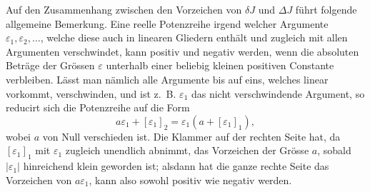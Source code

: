 \documentclass[11pt,a4paper,leqno]{article}
\begin{document}
Auf den Zusammenhang zwischen den Vorzeichen von $\delta J$ und $\Delta J$ führt folgende allgemeine Bemerkung. Eine reelle Potenzreihe irgend welcher Argumente $\varepsilon_1,\varepsilon_2,\ldots$, welche diese auch in linearen Gliedern enthält und zugleich mit allen Argumenten verschwindet, kann positiv und negativ werden, wenn die absoluten Beträge der Grössen $\varepsilon$ unterhalb einer beliebig kleinen positiven Constante verbleiben. Lässt man nämlich alle Argumente bis auf eins, welches linear vorkommt, verschwinden, und ist z.~B. $\varepsilon_1$ das nicht verschwindende Argument, so reducirt sich die Potenzreihe auf die Form
\[
a\varepsilon_1+[\varepsilon_1]_2=\varepsilon_1(a+[\varepsilon_1]_1),
\]
wobei $a$ von Null verschieden ist. Die Klammer auf der rechten Seite hat, da $[\varepsilon_1]_1$ mit $\varepsilon_1$ zugleich unendlich abnimmt, das Vorzeichen der Grösse $a$, sobald $|\varepsilon_1|$ hinreichend klein geworden ist; alsdann hat die ganze rechte Seite das Vorzeichen von $a\varepsilon_1$, kann also sowohl positiv wie negativ werden.
\end{document}
